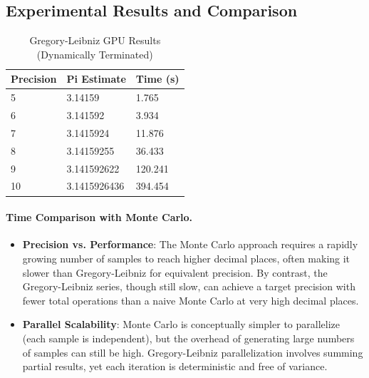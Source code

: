 \documentclass[12pt]{article}
\begin{document}
\subsection{Experimental Results and Comparison}
\begin{table}[H]
      \centering
      \caption{Gregory-Leibniz GPU Results (Dynamically Terminated)}\label{tab:gregory-leibniz-results}
      \begin{tabular}{|l|l|l|} %
            \hline
            \textbf{Precision} & \textbf{Pi Estimate} & \textbf{Time (s)} \\
            \hline
            5                  & 3.14159              & 1.765             \\
            6                  & 3.141592             & 3.934             \\
            7                  & 3.1415924            & 11.876            \\
            8                  & 3.14159255           & 36.433            \\
            9                  & 3.141592622          & 120.241           \\
            10                 & 3.1415926436         & 394.454           \\
            \hline
      \end{tabular}
\end{table}

\paragraph{Time Comparison with Monte Carlo.}
\begin{itemize}
      \item \textbf{Precision vs. Performance}: The Monte Carlo approach requires
            a rapidly growing number of samples to reach higher decimal places, often
            making it slower than Gregory-Leibniz for equivalent precision. By contrast,
            the Gregory-Leibniz series, though still slow, can achieve a target precision
            with fewer total operations than a naive Monte Carlo at very high decimal places.
      \item \textbf{Parallel Scalability}: Monte Carlo is conceptually simpler to
            parallelize (each sample is independent), but the overhead of generating
            large numbers of samples can still be high. Gregory-Leibniz parallelization
            involves summing partial results, yet each iteration is deterministic and
            free of variance.
\end{itemize}
\end{document}
